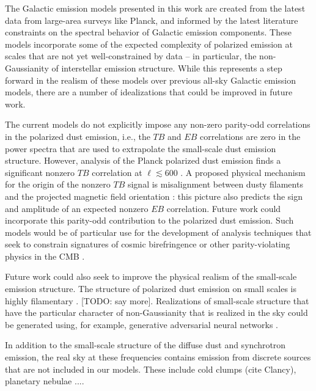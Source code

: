 \documentclass[twocolumn]{aastex631}
\newcommand{\giuse}[1]{\textcolor{orange}{(GP: #1)}}
\begin{document}
The Galactic emission models presented in this work are created from the latest data from large-area surveys like Planck, and informed by the latest literature constraints on the spectral behavior of Galactic emission components. These models incorporate some of the expected complexity of polarized emission at scales that are not yet well-constrained by data -- in particular, the non-Gaussianity of interstellar emission structure. While this represents a step forward in the realism of these models over previous all-sky Galactic emission models, there are a number of idealizations that could be improved in future work. 

The current models do not explicitly impose any non-zero parity-odd correlations in the polarized dust emission, i.e., the $TB$ and $EB$ correlations are zero in the power spectra that are used to extrapolate the small-scale dust emission structure. However, analysis of the Planck polarized dust emission finds a significant nonzero $TB$ correlation at $\ell \lesssim 600$ \citep{planck2016-l11A, Weiland:2020}. A proposed physical mechanism for the origin of the nonzero $TB$ signal is misalignment between dusty filaments and the projected magnetic field orientation \citep{Huffenberger:2020, Clark:2021, Cukierman:2023}: this picture also predicts the sign and amplitude of an expected nonzero $EB$ correlation. Future work could incorporate this parity-odd contribution to the polarized dust emission. Such models would be of particular use for the development of analysis techniques that seek to constrain signatures of cosmic birefringence or other parity-violating physics in the CMB \citep[e.g.,][]{Minami:2020, Eskilt:2022}.

Future work could also seek to improve the physical realism of the small-scale emission structure. The structure of polarized dust emission on small scales is highly filamentary \citep[e.g.,][]{Clark:2015, Halal:2024}. [TODO: say more]. Realizations of small-scale structure that have the particular character of non-Gaussianity that is realized in the sky could be generated using, for example, generative adversarial neural networks \citep{Krachmalnicoff:2021}.

In addition to the small-scale structure of the diffuse dust and synchrotron emission, the real sky at these frequencies contains emission from discrete sources that are not included in our models. These include cold clumps (cite Clancy), planetary nebulae ....

\end{document}
